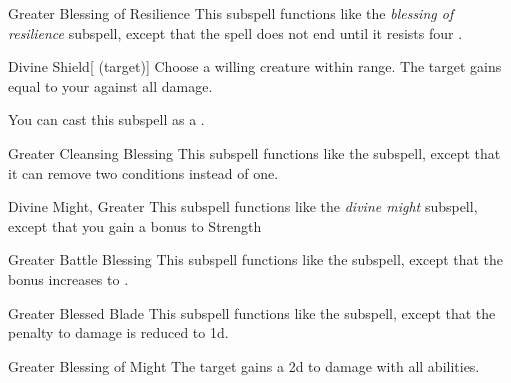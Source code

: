 \begin{ability}[\nth{3}]{Greater Blessing of Resilience}
This subspell functions like the \textit{blessing of resilience} subspell, except that the spell does not end until it resists four .
\end{ability}
\vspace{0.25em}



\begin{ability}[\nth{4}]{Divine Shield}[ (target)]
Choose a willing creature within \rngclose range.
The target gains  equal to your  against all damage.

You can cast this subspell as a .
\end{ability}
\vspace{0.25em}



\begin{ability}[\nth{4}]{Greater Cleansing Blessing}
This subspell functions like the  subspell, except that it can remove two conditions instead of one.
\end{ability}
\vspace{0.25em}



\begin{ability}[\nth{5}]{Divine Might, Greater}
This subspell functions like the \textit{divine might} subspell, except that you gain a  bonus to Strength
\end{ability}
\vspace{0.25em}



\begin{ability}[\nth{5}]{Greater Battle Blessing}
This subspell functions like the  subspell, except that the bonus increases to .
\end{ability}
\vspace{0.25em}



\begin{ability}[\nth{5}]{Greater Blessed Blade}
This subspell functions like the  subspell, except that the penalty to damage is reduced to \minus1d.
\end{ability}
\vspace{0.25em}



\begin{ability}[\nth{5}]{Greater Blessing of Might}
The target gains a \plus2d  to damage with all abilities.
\end{ability}
\vspace{0.25em}



